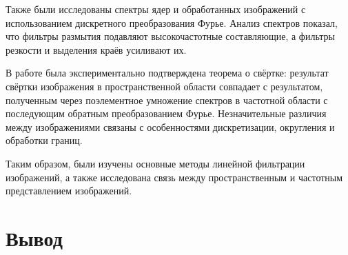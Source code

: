 \documentclass[a4paper, 12pt]{article}
\begin{document}
Также были исследованы спектры ядер и обработанных изображений с использованием дискретного преобразования Фурье. Анализ спектров показал, что фильтры размытия подавляют высокочастотные составляющие, а фильтры резкости и выделения краёв усиливают их.

В работе была экспериментально подтверждена теорема о свёртке: результат свёртки изображения в пространственной области совпадает с результатом, полученным через поэлементное умножение спектров в частотной области с последующим обратным преобразованием Фурье. Незначительные различия между изображениями связаны с особенностями дискретизации, округления и обработки границ.

Таким образом, были изучены основные методы линейной фильтрации изображений, а также исследована связь между пространственным и частотным представлением изображений.
    
    
    
    

\section*{Вывод}
\end{document}
